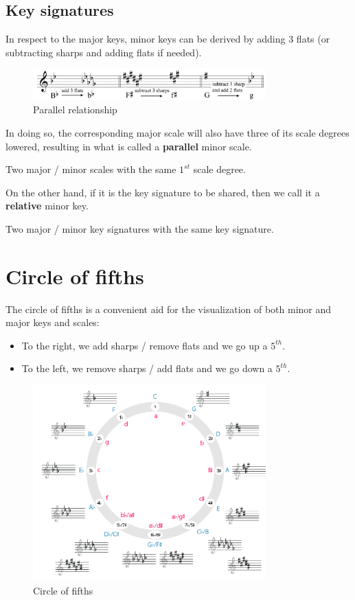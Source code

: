 \subsection{Key signatures}
In respect to the major keys, minor keys can be derived by adding 3 flats (or subtracting sharps and adding flats if needed).

\begin{figure}
    \begin{center}
        \includegraphics[width=0.8\textwidth]{img/parallel}
        \caption{Parallel relationship}
    \end{center}
\end{figure}

In doing so, the corresponding major scale will also have three of its scale degrees lowered, resulting in what is called a \textbf{parallel} minor scale.

\begin{definition}
    Two major / minor scales with the same $1^{st}$ scale degree.
\end{definition}

On the other hand, if it is the key signature to be shared, then we call it a \textbf{relative} minor key.

\begin{definition}
    Two major / minor key signatures with the same key signature.
\end{definition}

\section{Circle of fifths}
The circle of fifths is a convenient aid for the visualization of both minor and major keys and scales:
\begin{itemize}
    \item To the right, we add sharps / remove flats and we go up a $5^{th}$.
    \item To the left, we remove sharps / add flats and we go down a $5^{th}$.
\end{itemize}

\begin{figure}
    \begin{center}
        \includegraphics[width=0.8\textwidth]{img/circle}
        \caption{Circle of fifths}
    \end{center}
\end{figure}